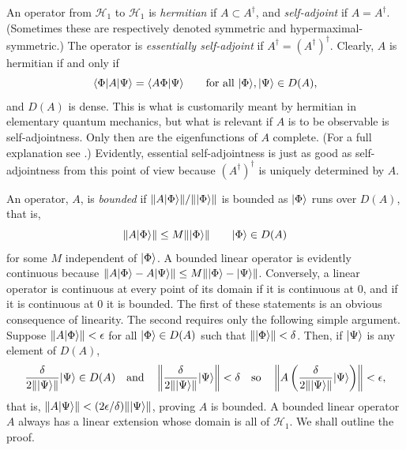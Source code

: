 An operator from $\mathcal{H}_1$ to $\mathcal{H}_1$ is \emph{hermitian} if
$A\subset A^\dagger$, and \emph{self-adjoint} if $A=A^\dagger$.
(Sometimes these are respectively denoted symmetric and
hypermaximal-symmetric.)  The operator is \emph{essentially self-adjoint} if
$A^\dagger=(A^\dagger)^\dagger$.  Clearly, $A$ is hermitian if and only if
\begin{equation*}
  \langle \Phi\vert A\vert \Psi\rangle=\langle A\Phi\vert \Psi\rangle
  \qquad\text{for all }\lvert \Phi\rangle,\lvert \Psi\rangle\in D(A),
\end{equation*}
and $D(A)$ is dense.  This is what is customarily meant by hermitian in
elementary quantum mechanics, but what is relevant if $A$ is to be observable
is self-adjointness.  Only then are the eigenfunctions of $A$ complete.  (For
a full explanation see \cite{pct-20}.) Evidently, essential self-adjointness is
just as good as self-adjointness from this point of view because
$(A^\dagger)^\dagger$ is uniquely determined by $A$.

An operator, $A$, is \emph{bounded} if
$\lVert A\lvert \Phi\rangle\rVert/\lVert\lvert \Phi\rangle\rVert$ is bounded as $\lvert \Phi\rangle$
runs over $D(A)$, that is,
\begin{equation*}
  \lVert A\lvert \Phi\rangle\rVert\leq M\lVert\lvert \Phi\rangle\rVert
  \qquad \lvert \Phi\rangle\in D(A)
\end{equation*}
for some $M$ independent of $\lvert \Phi\rangle$.  A bounded linear operator is
evidently continuous because
$\lVert A\lvert \Phi\rangle-A\lvert \Psi\rangle\rVert\leq
M\lVert\lvert \Phi\rangle-\lvert \Psi\rangle\rVert$.  Conversely, a linear operator is
continuous at every point of its domain if it is continuous at $0$, and if it
is continuous at $0$ it is bounded.  The first of these statements is an
obvious consequence of linearity.  The second requires only the following
simple argument.  Suppose $\lVert A\lvert \Phi\rangle\rVert<\epsilon$ for all
$\lvert \Phi\rangle\in D(A)$ such that $\lVert\lvert \Phi\rangle\rVert<\delta$.  Then, if
$\lvert \Psi\rangle$ is any element of $D(A)$,
\begin{equation*}
  \frac{\delta}{2\lVert\lvert \Psi\rangle\rVert}\lvert \Psi\rangle\in D(A)
  \quad\text{and}\quad
  \left\lVert\frac{\delta}{2\lVert\lvert \Psi\rangle\rVert}\lvert \Psi\rangle\right\rVert<\delta
  \quad\text{so}\quad
  \left\lVert A\left(\frac{\delta}{2\lVert\lvert \Psi\rangle\rVert}\lvert \Psi\rangle\right)\right\rVert
  <\epsilon,
\end{equation*}
that is, $\lVert A\lvert \Psi\rangle\rVert<(2\epsilon/\delta)\lVert\lvert \Psi\rangle\rVert$,
proving $A$ is bounded.  A bounded linear operator $A$ always has a linear
extension whose domain is all of $\mathcal{H}_1$.  We shall outline the proof.

